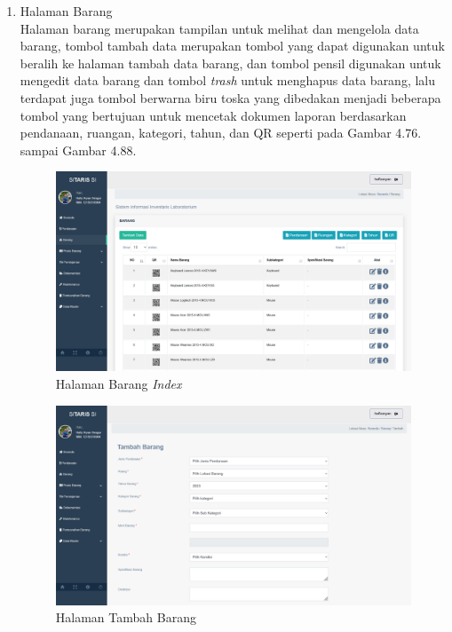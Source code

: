 \begin{enumerate}
  \item Halaman Barang \\ Halaman barang merupakan tampilan untuk melihat dan mengelola data barang, tombol tambah data merupakan tombol yang dapat digunakan untuk beralih ke halaman tambah data barang, dan tombol pensil digunakan untuk mengedit data barang dan tombol \textit{trash} untuk menghapus data barang, lalu terdapat juga tombol berwarna biru toska yang dibedakan menjadi beberapa tombol yang bertujuan untuk mencetak dokumen laporan berdasarkan pendanaan, ruangan, kategori, tahun, dan QR seperti pada Gambar 4.76. sampai Gambar 4.88.

        \begin{figure}
          \centering
          \includegraphics[width=0.82\linewidth]{konten//gambar/barang.png}
          \caption{Halaman Barang \textit{Index}}
          \label{fig:enter-label}
        \end{figure}

        \begin{figure}
          \centering
          \includegraphics[width=0.82\linewidth]{konten//gambar/barang tambah.png}
          \caption{Halaman Tambah Barang}
          \label{fig:enter-label}
        \end{figure}


\end{enumerate}

